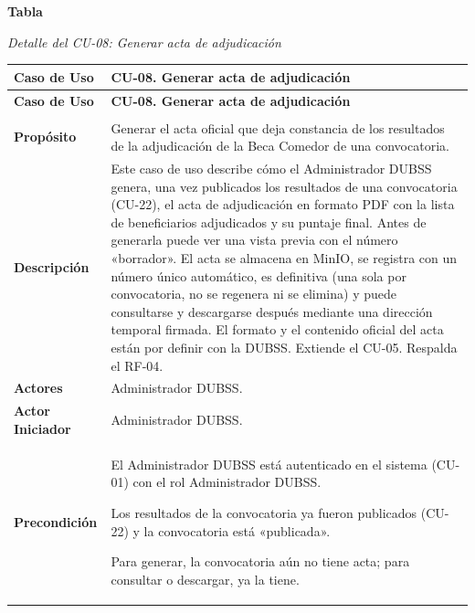 \label{tab:detalle_cu08}
\noindent\textbf{Tabla~\thetable}\par\nopagebreak
\noindent\textit{Detalle del CU-08: Generar acta de adjudicación}\par\nopagebreak
\begingroup\small\linespread{1}\selectfont
\begin{longtable}{>{\raggedright\arraybackslash}p{2.9cm} >{\raggedright\arraybackslash}p{12.6cm}}
\toprule
\textbf{Caso de Uso} & \textbf{CU-08. Generar acta de adjudicación} \\
\midrule
\endfirsthead
\toprule
\textbf{Caso de Uso} & \textbf{CU-08. Generar acta de adjudicación} \\
\midrule
\endhead
\endfoot
\bottomrule
\multicolumn{2}{l}{\textit{Nota.} Elaboración propia.} \\
\endlastfoot
\textbf{Propósito} & Generar el acta oficial que deja constancia de los resultados de la adjudicación de la Beca Comedor de una convocatoria. \\
\midrule
\textbf{Descripción} & Este caso de uso describe cómo el Administrador DUBSS genera, una vez publicados los resultados de una convocatoria (CU-22), el acta de adjudicación en formato PDF con la lista de beneficiarios adjudicados y su puntaje final. Antes de generarla puede ver una vista previa con el número «borrador». El acta se almacena en MinIO, se registra con un número único automático, es definitiva (una sola por convocatoria, no se regenera ni se elimina) y puede consultarse y descargarse después mediante una dirección temporal firmada. El formato y el contenido oficial del acta están por definir con la DUBSS. Extiende el CU-05. Respalda el RF-04. \\
\midrule
\textbf{Actores} & Administrador DUBSS. \\
\midrule
\textbf{Actor Iniciador} & Administrador DUBSS. \\
\midrule
\textbf{Precondición} & \vspace{-\baselineskip}\begin{cuvin}
    \item El Administrador DUBSS está autenticado en el sistema (CU-01) con el rol Administrador DUBSS.
    \item Los resultados de la convocatoria ya fueron publicados (CU-22) y la convocatoria está «publicada».
    \item Para generar, la convocatoria aún no tiene acta; para consultar o descargar, ya la tiene.

\end{cuvin}
\end{longtable}
